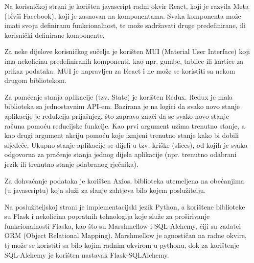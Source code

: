                 \par    Na korisničkoj strani je korišten javascript radni okvir React, koji je razvila Meta (bivši Facebook), koji je 
                zasnovan na komponentama. Svaka komponenta može imati svoju definiranu funkcionalnost, te može sadržavati druge predefinirane, 
                ili korisnički definirane komponente.

                \par    Za neke dijelove korisničkog sučelja je korišten MUI (Material User Interface) koji ima nekolicinu predefiniranih
                komponenti, kao npr. gumbe, tablice ili kartice za prikaz podataka. MUI je napravljen za React i ne može se koristiti
                sa nekom drugom bibliotekom.

                \par    Za pamćenje stanja aplikacije (tzv. State) je korišten Redux. Redux je mala biblioteka sa jednostavnim API-em.
                Bazirana je na logici da svako novo stanje aplikacije je redukcija prijašnjeg, što zapravo znači da se
                svako novo stanje računa pomoću reducijske funkcije. Kao prvi argument uzima trenutno stanje, a kao drugi
                argument akciju pomoću koje izmjeni trenutno stanje kako bi dobili sljedeće. Ukupno stanje aplikacije se 
                dijeli u tzv. kriške (slices), od kojih je svaka odgovorna za praćenje stanja jednog dijela aplikacije (npr.
                trenutno odabrani jezik ili trenutno stanje odabranog rječnika).

                \par    Za dohvaćanje podataka je korišten Axios, biblioteka utemeljena na obećanjima (u javascriptu) koja služi
                za slanje zahtjeva bilo kojem poslužitelju. 

                \par    Na poslužiteljskoj strani je implementacijski jezik Python, a korištene biblioteke su Flask i nekolicina popratnih
                tehnologija koje služe za proširivanje funkcionalnosti Flaska, kao što su Marshmellow i SQL-Alchemy, čiji su
                zadatci ORM (Object Relational Mapping). Marshmellow je agnostičan na radne okvire, tj može se koristiti sa bilo
                kojim radnim okvirom u pythonu, dok za korištenje SQL-Alchemy je korišten nastavak Flask-SQLAlchemy. 

